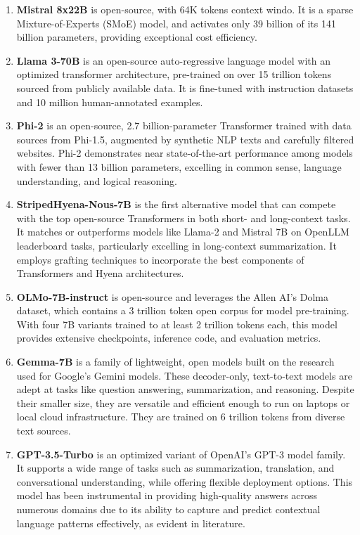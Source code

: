\documentclass[11pt]{article}
\begin{document}
\begin{enumerate}
    \item \textbf{Mistral 8x22B} is open-source, with 64K tokens context windo.  It is a sparse Mixture-of-Experts (SMoE) model, and activates only 39 billion of its 141 billion parameters, providing exceptional cost efficiency.
    
    \item \textbf{Llama 3-70B} is an open-source auto-regressive language model with an optimized transformer architecture, pre-trained on over 15 trillion tokens sourced from publicly available data. It is fine-tuned with instruction datasets and 10 million human-annotated examples.
    
    \item \textbf{Phi-2} is an open-source, 2.7 billion-parameter Transformer trained with data sources from Phi-1.5, augmented by synthetic NLP texts and carefully filtered websites. Phi-2 demonstrates near state-of-the-art performance among models with fewer than 13 billion parameters, excelling in common sense, language understanding, and logical reasoning.
    
    \item \textbf{StripedHyena-Nous-7B} is the first alternative model that can compete with the top open-source Transformers in both short- and long-context tasks. It matches or outperforms models like Llama-2 and Mistral 7B on OpenLLM leaderboard tasks, particularly excelling in long-context summarization. It employs grafting techniques to incorporate the best components of Transformers and Hyena architectures.
    
    \item \textbf{OLMo-7B-instruct} is open-source and leverages the Allen AI's Dolma dataset, which contains a 3 trillion token open corpus for model pre-training. With four 7B variants trained to at least 2 trillion tokens each, this model provides extensive checkpoints, inference code, and evaluation metrics.
    
    \item \textbf{Gemma-7B} is a family of lightweight, open models built on the research used for Google's Gemini models. These decoder-only, text-to-text models are adept at tasks like question answering, summarization, and reasoning. Despite their smaller size, they are versatile and efficient enough to run on laptops or local cloud infrastructure. They are trained on 6 trillion tokens from diverse text sources.

    \item \textbf{GPT-3.5-Turbo} is an optimized variant of OpenAI's GPT-3 model family. It supports a wide range of tasks such as summarization, translation, and conversational understanding, while offering flexible deployment options. This model has been instrumental in providing high-quality answers across numerous domains due to its ability to capture and predict contextual language patterns effectively, as evident in literature.


\end{enumerate}
\end{document}

